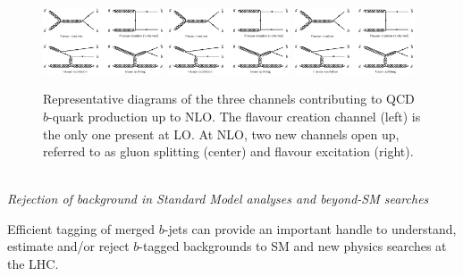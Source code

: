 \begin{figure}[h!]
\centering
\includegraphics[width=0.32\textwidth,viewport=0 880 1500 1600,clip]{FIGS/bb_diagrams.jpg}
\includegraphics[width=0.32\textwidth,viewport=1600 0 3100 820,clip]{FIGS/bb_diagrams.jpg}
\includegraphics[width=0.32\textwidth,viewport=0 0 1500 820,clip]{FIGS/bb_diagrams.jpg}
\caption{Representative diagrams of the three channels contributing to QCD $b$-quark production up to NLO. The flavour creation channel (left) is the only one present at LO. At NLO, two new channels open up, referred to as gluon splitting (center) and  flavour excitation (right).}
\label{fig:qcd_diagrams}
\end{figure}
%
\\[5mm]
{\em Rejection of background in Standard Model analyses and beyond-SM searches}

Efficient tagging of merged $b$-jets can provide an important handle to understand, estimate and/or reject $b$-tagged backgrounds to SM and new physics searches at the LHC.



